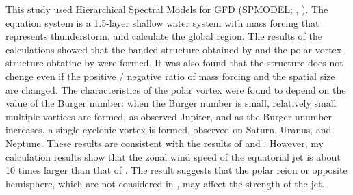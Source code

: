 \documentclass[a4j,12pt,openbib,oneside]{jreport}
\begin{document}
This study used Hierarchical Spectral Models for GFD (SPMODEL; \cite{spmodel2006}, \cite{spmodel2013}).
%
The equation system is a 1.5-layer shallow water system 
with mass forcing that represents thunderstorm,
and calculate the global region.
%
The results of the calculations showed 
that the banded structure obtained by \cite{Showman2007} and 
the polar vortex structure obtatine by \cite{Brueshaber2019} were formed.
%
It was also found that the structure does not chenge even if the positive / negative 
ratio of mass forcing and the spatial size are changed.
%
The characteristics of the polar vortex were 
found to depend on the value of the Burger number:
when the Burger number is small, relatively small multiple vortices are formed, as observed Jupiter,
and as the Burger nnumber increases, a single cyclonic vortex is formed, observed on Saturn, Uranus, and Neptune.
%
These results are consistent with the results of \cite{Showman2007} and \cite{Brueshaber2019}.
%
However, my calculation results show that 
the zonal wind speed of the equatorial jet is 
about 10 times larger than that of \cite{Showman2007}.
%
The result suggests that the polar reion or opposite hemisphere,
which are not considered in \cite{Showman2007}, may affect the strength of the jet.
%


\end{document}
